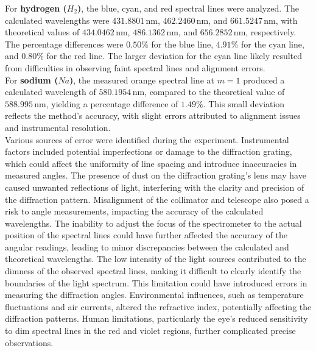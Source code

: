 \documentclass[a4paper,11pt]{article}
\begin{document}
For \textbf{hydrogen (\(H_2\))}, the blue, cyan, and red spectral lines were analyzed. The calculated wavelengths were \(431.8801 \, \text{nm}\), \(462.2460 \, \text{nm}\), and \(661.5247 \, \text{nm}\), with theoretical values of \(434.0462 \, \text{nm}\), \(486.1362 \, \text{nm}\), and \(656.2852 \, \text{nm}\), respectively. The percentage differences were \(0.50\%\) for the blue line, \(4.91\%\) for the cyan line, and \(0.80\%\) for the red line. The larger deviation for the cyan line likely resulted from difficulties in observing faint spectral lines and alignment errors.\\

For \textbf{sodium (\(Na\))}, the measured orange spectral line at \(m=1\) produced a calculated wavelength of \(580.1954 \, \text{nm}\), compared to the theoretical value of \(588.995 \, \text{nm}\), yielding a percentage difference of \(1.49\%\). This small deviation reflects the method's accuracy, with slight errors attributed to alignment issues and instrumental resolution.\\

Various sources of error were identified during the experiment. Instrumental factors included potential imperfections or damage to the diffraction grating, which could affect the uniformity of line spacing and introduce inaccuracies in measured angles. The presence of dust on the diffraction grating's lens may have caused unwanted reflections of light, interfering with the clarity and precision of the diffraction pattern. Misalignment of the collimator and telescope also posed a risk to angle measurements, impacting the accuracy of the calculated wavelengths. The inability to adjust the focus of the spectrometer to the actual position of the spectral lines could have further affected the accuracy of the angular readings, leading to minor discrepancies between the calculated and theoretical wavelengths. The low intensity of the light sources contributed to the dimness of the observed spectral lines, making it difficult to clearly identify the boundaries of the light spectrum. This limitation could have introduced errors in measuring the diffraction angles. Environmental influences, such as temperature fluctuations and air currents, altered the refractive index, potentially affecting the diffraction patterns. Human limitations, particularly the eye's reduced sensitivity to dim spectral lines in the red and violet regions, further complicated precise observations.\\
\end{document}

